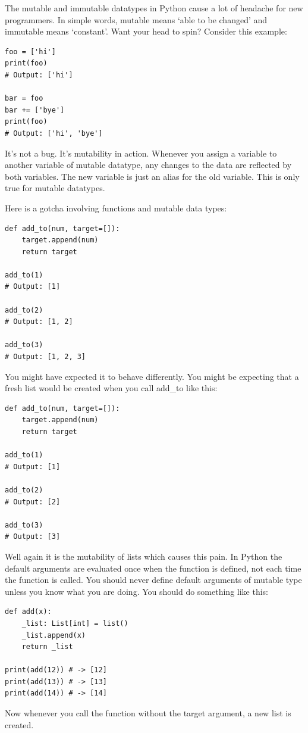 \documentclass{report}
\begin{document}
    The mutable and immutable datatypes in Python cause a lot of headache for new programmers. In simple words, mutable means ‘able to be changed’ and immutable means ‘constant’. Want your head to spin? Consider this example:
    \begin{verbatim}
foo = ['hi']
print(foo)
# Output: ['hi']

bar = foo
bar += ['bye']
print(foo)
# Output: ['hi', 'bye']
    \end{verbatim}
    It’s not a bug. It’s mutability in action. Whenever you assign a variable to another variable of mutable datatype, any changes to the data are reflected by both variables. The new variable is just an alias for the old variable. This is only true for mutable datatypes. 

    \bigbreak \noindent 
    \bigbreak \noindent 
    Here is a gotcha involving functions and mutable data types:
    \begin{verbatim}
def add_to(num, target=[]):
    target.append(num)
    return target

add_to(1)
# Output: [1]

add_to(2)
# Output: [1, 2]

add_to(3)
# Output: [1, 2, 3]
    \end{verbatim}
    You might have expected it to behave differently. You might be expecting that a fresh list would be created when you call add\_to like this:
    \begin{verbatim}
def add_to(num, target=[]):
    target.append(num)
    return target

add_to(1)
# Output: [1]

add_to(2)
# Output: [2]

add_to(3)
# Output: [3]
    \end{verbatim}
    Well again it is the mutability of lists which causes this pain. In Python the default arguments are evaluated once when the function is defined, not each time the function is called. You should never define default arguments of mutable type unless you know what you are doing. You should do something like this:
    \begin{verbatim}
def add(x):
    _list: List[int] = list()
    _list.append(x)
    return _list

print(add(12)) # -> [12]
print(add(13)) # -> [13]
print(add(14)) # -> [14]
    \end{verbatim}
    Now whenever you call the function without the target argument, a new list is created. 
\end{document}
